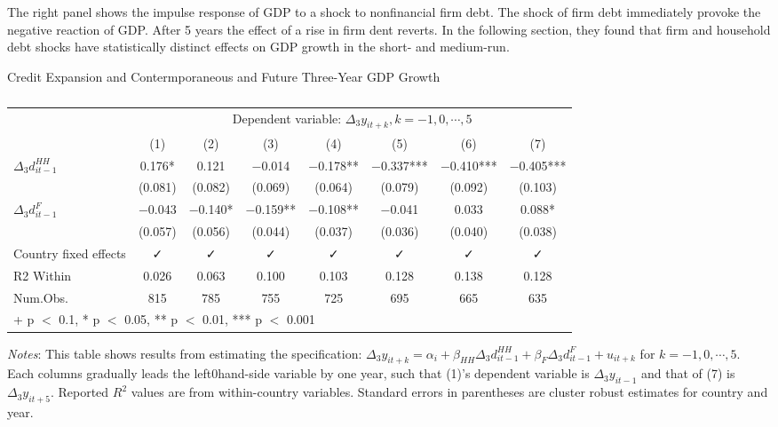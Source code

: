 \documentclass{ltjarticle}
\begin{document}
The right panel shows the impulse response of GDP to a shock to nonfinancial firm debt. The shock of firm debt immediately provoke the negative reaction of GDP. After 5 years the effect of a rise in firm dent reverts. In the following section, they found that firm and household debt shocks have statistically distinct effects on GDP growth in the short- and medium-run.

\begin{table}[h]
    \small
    \begin{center}
        \caption{}{Credit Expansion and Contermporaneous and Future Three-Year GDP Growth}
        \label{table2}
        \begin{tabular}[t]{lccccccc}
            \toprule
            & \multicolumn{7}{c}{Dependent variable: $\Delta_{3}y_{it+k}, k=-1,0,\cdots,5$} \\
            \cline{2-8}
              & (1) & (2) & (3) & (4) & (5) & (6) & (7)\\
            \midrule
            $\Delta_{3}d_{it-1}^{HH} $ & \num{0.176}* & \num{0.121} & \num{-0.014} & \num{-0.178}** & \num{-0.337}*** & \num{-0.410}*** & \num{-0.405}***\\
             & (\num{0.081}) & (\num{0.082}) & (\num{0.069}) & (\num{0.064}) & (\num{0.079}) & (\num{0.092}) & (\num{0.103})\\
            $\Delta_{3}d_{it-1}^{F} $ & \num{-0.043} & \num{-0.140}* & \num{-0.159}** & \num{-0.108}** & \num{-0.041} & \num{0.033} & \num{0.088}*\\
             & (\num{0.057}) & (\num{0.056}) & (\num{0.044}) & (\num{0.037}) & (\num{0.036}) & (\num{0.040}) & (\num{0.038})\\
            \midrule
            Country fixed effects & ✓ & ✓ & ✓ & ✓ & ✓ & ✓ & ✓\\
            R2 Within & \num{0.026} & \num{0.063} & \num{0.100} & \num{0.103} & \num{0.128} & \num{0.138} & \num{0.128}\\
            Num.Obs. & \num{815} & \num{785} & \num{755} & \num{725} & \num{695} & \num{665} & \num{635}\\
            \bottomrule
            \multicolumn{8}{l}{\rule{0pt}{1em}+ p $<$ 0.1, * p $<$ 0.05, ** p $<$ 0.01, *** p $<$ 0.001}\\
        \end{tabular}
    \end{center}
    \begin{tablenotes}
        \small
        \item \textit{Notes}: This table shows results from estimating the specification: $\Delta_{3}y_{it+k}=\alpha_{i}+\beta_{HH}\Delta_{3}d_{it-1}^{HH}+\beta_{F}\Delta_{3}d_{it-1}^{F}+u_{it+k}$ for $k=-1,0,\cdots,5$. Each columns gradually leads the left0hand-side variable by one year, such that (1)'s dependent variable is $\Delta_{3}y_{it-1}$ and that of (7) is $\Delta_{3}y_{it+5}$. Reported $R^{2}$ values are from within-country variables. Standard errors in parentheses are cluster robust estimates for country and year.
    \end{tablenotes}
\end{table}
\end{document}
